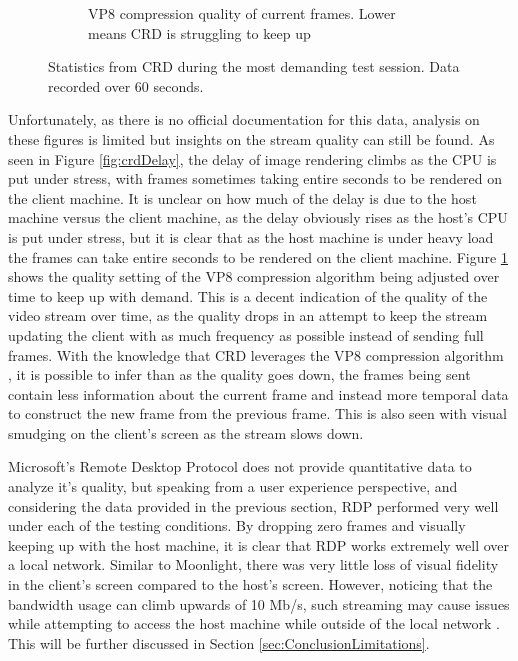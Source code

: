 \begin{figure}[h]
\begin{subfigure}{.33\textwidth}
    \captionsetup{width=.85\linewidth}
    \caption{VP8 compression quality of current frames. Lower means CRD is struggling to keep up}
    \label{fig:crdQuality}
  \end{subfigure}
  \captionsetup{width=.8\linewidth}
  \caption[CRD Data]{Statistics from CRD during the most demanding test session. Data recorded over 60 seconds.}
  \label{fig:crdStats}
\end{figure}

Unfortunately, as there is no official documentation for this data, analysis on these figures is limited but insights on the stream quality can still be found.
As seen in Figure \ref{fig:crdDelay}, the delay of image rendering climbs as the CPU is put under stress, with frames sometimes taking entire seconds to be rendered on the client machine.
It is unclear on how much of the delay is due to the host machine versus the client machine, as the delay obviously rises as the host's CPU is put under stress, but it is clear that as the host machine is under heavy load the frames can take entire seconds to be rendered on the client machine.
Figure \ref{fig:crdQuality} shows the quality setting of the VP8 compression algorithm being adjusted over time to keep up with demand.
This is a decent indication of the quality of the video stream over time, as the quality drops in an attempt to keep the stream updating the client with as much frequency as possible instead of sending full frames.
With the knowledge that CRD leverages the VP8 compression algorithm \cite{miniorange_chromoting}, it is possible to infer than as the quality goes down, the frames being sent contain less information about the current frame and instead more temporal data to construct the new frame from the previous frame.
This is also seen with visual smudging on the client's screen as the stream slows down.

Microsoft's Remote Desktop Protocol does not provide quantitative data to analyze it's quality, but speaking from a user experience perspective, and considering the data provided in the previous section, RDP performed very well under each of the testing conditions.
By dropping zero frames and visually keeping up with the host machine, it is clear that RDP works extremely well over a local network.
Similar to Moonlight, there was very little loss of visual fidelity in the client's screen compared to the host's screen.
However, noticing that the bandwidth usage can climb upwards of 10 Mb/s, such streaming may cause issues while attempting to access the host machine while outside of the local network \cite{rdp_bandwidth}.
This will be further discussed in Section \ref{sec:ConclusionLimitations}.

